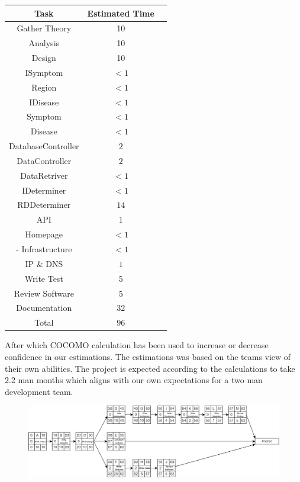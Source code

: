 \begin{center}
	\begin{tabular}[h]{|c|c|c|}
		\hline
		Task & Estimated Time \\ \hline
		Gather Theory & 10 \\ \hline
		Analysis & 10 \\ \hline
		Design & 10 \\ \hline
		ISymptom & $<1$ \\ \hline
		Region & $<1$ \\ \hline
		IDisease & $<1$ \\ \hline
		Symptom & $<1$  \\ \hline
		Disease & $<1$ \\ \hline
		DatabaseController & $2$ \\ \hline
		DataController & $2$  \\ \hline
		DataRetriver & $<1$ \\ \hline
		IDeterminer & $<1$ \\ \hline
		RDDeterminer & $14$ \\ \hline
		API & $1$ \\ \hline
		Homepage & $<1$ \\ \hline-
		Infrastructure & $<1$ \\ \hline
		IP \& DNS & $1$  \\ \hline
		Write Test & 5 \\ \hline
		Review Software & 5 \\ \hline
		Documentation & 32\\ \hline
		Total & $ 96 $ \\ \hline
	\end{tabular}
\end{center}

After which COCOMO calculation\cite{NasaCOCOMOCalculation} has been used to increase or decrease confidence in our estimations. The estimations was based on the teams view of their own abilities. The project is expected according to the calculations to take 2.2 man months which aligns with our own expectations for a two man development team.

\pagebreak
\begin{center}
	\begin{figure}
		\includegraphics[width=42em,keepaspectratio]{Network Diagram.png}
	\end{figure}
\end{center}


